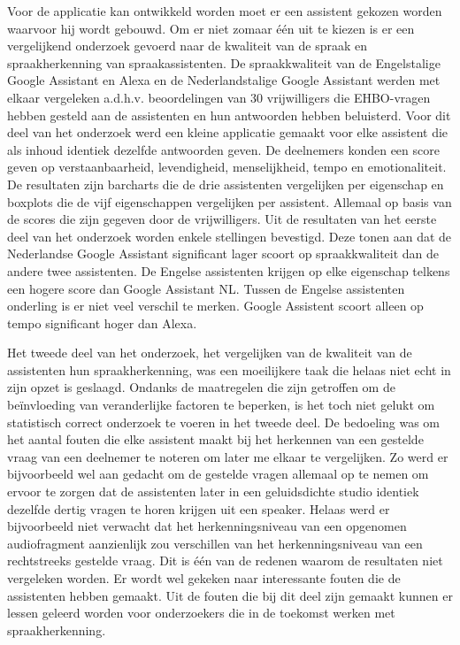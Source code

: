 Voor de applicatie kan ontwikkeld worden moet er een assistent gekozen worden waarvoor hij wordt gebouwd. Om er niet zomaar één uit te kiezen is er een vergelijkend onderzoek gevoerd naar de kwaliteit van de spraak en spraakherkenning van spraakassistenten.
De spraakkwaliteit van de Engelstalige Google Assistant en Alexa en de Nederlandstalige Google Assistant werden met elkaar vergeleken a.d.h.v. beoordelingen van 30 vrijwilligers die EHBO-vragen hebben gesteld aan de assistenten en hun antwoorden hebben beluisterd. Voor dit deel van het onderzoek werd een kleine applicatie gemaakt voor elke assistent die als inhoud identiek dezelfde antwoorden geven. De deelnemers konden een score geven op verstaanbaarheid, levendigheid, menselijkheid, tempo en emotionaliteit. De resultaten zijn barcharts die de drie assistenten vergelijken per eigenschap en boxplots die de vijf eigenschappen vergelijken per assistent. Allemaal op basis van de scores die zijn gegeven door de vrijwilligers.
Uit de resultaten van het eerste deel van het onderzoek worden enkele stellingen bevestigd. Deze tonen aan dat de Nederlandse Google Assistant significant lager scoort op spraakkwaliteit dan de andere twee assistenten. De Engelse assistenten krijgen op elke eigenschap telkens een hogere score dan Google Assistant NL. Tussen de Engelse assistenten onderling is er niet veel verschil te merken. Google Assistent scoort alleen op tempo significant hoger dan Alexa.

Het tweede deel van het onderzoek, het vergelijken van de kwaliteit van de assistenten hun spraakherkenning, was een moeilijkere taak die helaas niet echt in zijn opzet is geslaagd. Ondanks de maatregelen die zijn getroffen om de beïnvloeding van veranderlijke factoren te beperken, is het toch niet gelukt om statistisch correct onderzoek te voeren in het tweede deel. De bedoeling was om het aantal fouten die elke assistent maakt bij het herkennen van een gestelde vraag van een deelnemer te noteren om later me elkaar te vergelijken. Zo werd er bijvoorbeeld wel aan gedacht om de gestelde vragen allemaal op te nemen om ervoor te zorgen dat de assistenten later in een geluidsdichte studio identiek dezelfde dertig vragen te horen krijgen uit een speaker. Helaas werd er bijvoorbeeld niet verwacht dat het herkenningsniveau van een opgenomen audiofragment aanzienlijk zou verschillen van het herkenningsniveau van een rechtstreeks gestelde vraag. Dit is één van de redenen waarom de resultaten niet vergeleken worden. Er wordt wel gekeken naar interessante fouten die de assistenten hebben gemaakt. Uit de fouten die bij dit deel zijn gemaakt kunnen er lessen geleerd worden voor onderzoekers die in de toekomst werken met spraakherkenning.

